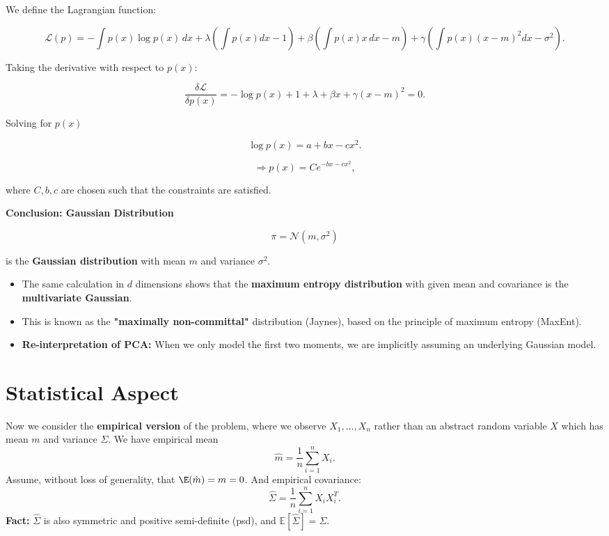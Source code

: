 \documentclass{article}
\begin{document}
We define the Lagrangian function:

\[
\mathcal{L}(p) = -\int p(x) \log p(x) \, dx + \lambda \left( \int p(x) dx - 1 \right) +
\beta \left( \int p(x) x \, dx - m \right) + \gamma \left( \int p(x) (x - m)^2 dx - \sigma^2 \right).
\]


Taking the derivative with respect to \( p(x) \):

\[
\frac{\delta \mathcal{L}}{\delta p(x)} = -\log p(x) + 1 + \lambda + \beta x + \gamma (x - m)^2 = 0.
\]

Solving for \( p(x) \)

\[
\log p(x) = a + bx - c x^2.
\]

\[
\Rightarrow p(x) = C e^{-bx - c x^2},
\]

where \( C, b, c \) are chosen such that the constraints are satisfied.

\textbf{Conclusion: Gaussian Distribution}

\[
\pi = \mathcal{N}(m, \sigma^2)
\]

is the \textbf{Gaussian distribution} with mean \( m \) and variance \( \sigma^2 \).



\begin{itemize}
    \item The same calculation in \( d \) dimensions shows that the \textbf{maximum entropy distribution} with given mean and covariance is the \textbf{multivariate Gaussian}.
    \item This is known as the \textbf{"maximally non-committal"} distribution (Jaynes), based on the principle of maximum entropy (MaxEnt).
    \item \textbf{Re-interpretation of PCA:} When we only model the first two moments, we are implicitly assuming an underlying Gaussian model.
\end{itemize}

\section{Statistical Aspect}
Now we consider the \textbf{empirical version} of the problem, where we observe \( X_1, \dots, X_n \) rather than  an abstract random variable \( X \) which has mean $m$ and variance $\Sigma$. We have empirical mean
\[
\hat{m} = \frac{1}{n} \sum_{i=1}^{n} X_i.
\]
Assume, without loss of generality, that \(\E(\hat{m})= m = 0 \). And empirical covariance:
\[
\hat{\Sigma} = \frac{1}{n} \sum_{i=1}^{n} X_i X_i^T.
\]
\textbf{Fact:} \( \hat{\Sigma} \) is also symmetric and positive semi-definite (psd), and $\mathbb{E}[\hat{\Sigma}]  = \Sigma.$
\end{document}
